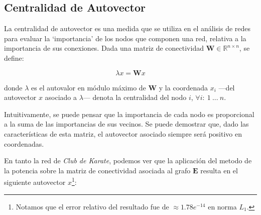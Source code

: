\subsection{Centralidad de Autovector} La centralidad de autovector es una medida que se utiliza en el análisis de redes para evaluar la `importancia' de los nodos que componen una red, relativa a la importancia de sus conexiones. Dada una matriz de conectividad $\mathbf{W} \in \mathbb{R}^{n \times n}$, se define:

\vspace{1em}
\begin{equation} \label{conectividad}
    \lambda x = \mathbf{W} x
\end{equation}

\vspace{1em}
\noindent donde $\lambda$ es el autovalor en módulo máximo de \textbf{W} y la coordenada $x_i$ ---del autovector $x$ asociado a $\lambda$--- denota la centralidad del nodo $i$, $\forall i:\ 1\ ...\ n$.

\vspace{1em}
Intuitivamente, se puede pensar que la importancia de cada nodo es proporcional a la suma de las importancias de sus vecinos. Se puede demostrar \cite{Newman} que, dado las características de esta matriz, el autovector asociado siempre será positivo en coordenadas.

\vspace{1em}
En tanto la red de \textit{Club de Karate}, podemos ver que la aplicación del metodo de la potencia sobre la matriz de conectividad asociada al grafo $\mathbf{E}$ resulta en el siguiente autovector $x$\footnote{Notamos que el error relativo del resultado fue de $\approx 1.78e^{-14}$ en norma $L_1$.}:

